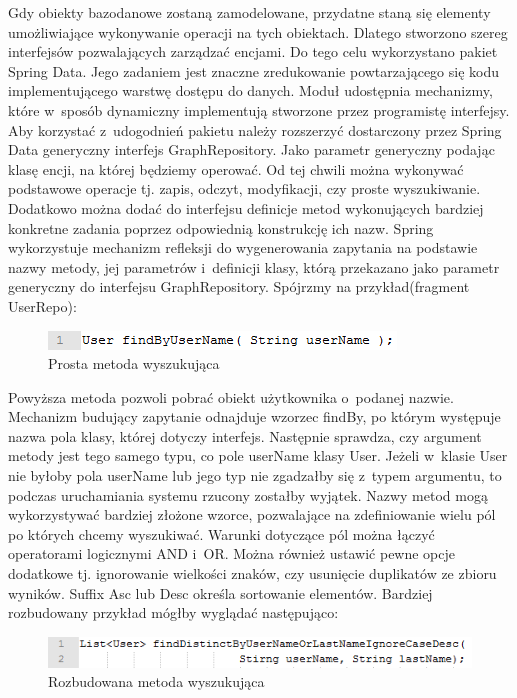 Gdy obiekty bazodanowe zostaną zamodelowane, przydatne staną się elementy umożliwiające wykonywanie operacji na tych obiektach. Dlatego stworzono szereg interfejsów pozwalających zarządzać encjami. Do tego celu wykorzystano pakiet Spring Data. Jego zadaniem jest znaczne zredukowanie powtarzającego się kodu implementującego warstwę dostępu do danych. Moduł udostępnia mechanizmy, które w~sposób dynamiczny implementują stworzone przez programistę interfejsy. Aby korzystać z~udogodnień pakietu należy rozszerzyć dostarczony przez Spring Data generyczny interfejs GraphRepository. Jako parametr generyczny podając klasę encji, na której będziemy operować. Od tej chwili można wykonywać podstawowe operacje tj. zapis, odczyt, modyfikacji, czy proste wyszukiwanie. Dodatkowo można dodać do interfejsu definicje metod wykonujących bardziej konkretne zadania poprzez odpowiednią konstrukcję ich nazw. Spring wykorzystuje mechanizm refleksji do wygenerowania zapytania na podstawie nazwy metody, jej parametrów i~definicji klasy, którą przekazano jako parametr generyczny do interfejsu GraphRepository. Spójrzmy na przykład(fragment UserRepo)\cite{repoWww}:

\begin{figure}[H]
	\centering
	\includegraphics{images/findbyusername.png}
	\caption{Prosta metoda wyszukująca}
\end{figure}


Powyższa metoda pozwoli pobrać obiekt użytkownika o~podanej nazwie. Mechanizm budujący zapytanie odnajduje wzorzec findBy, po którym występuje nazwa pola klasy, której dotyczy interfejs. Następnie sprawdza, czy argument metody jest tego samego typu, co pole userName klasy User. Jeżeli w~klasie User nie byłoby pola userName lub jego typ nie zgadzałby się z~typem argumentu, to podczas uruchamiania systemu rzucony zostałby wyjątek. 
Nazwy metod mogą wykorzystywać bardziej złożone wzorce, pozwalające na zdefiniowanie wielu pól po których chcemy wyszukiwać. Warunki dotyczące pól można łączyć operatorami logicznymi AND i~OR.  Można również ustawić pewne opcje dodatkowe tj. ignorowanie wielkości znaków, czy usunięcie duplikatów ze zbioru wyników. Suffix Asc lub Desc określa sortowanie elementów. Bardziej rozbudowany przykład mógłby wyglądać następująco:

\begin{figure}[H]
	\centering
	\includegraphics{images/findlong.png}
	\caption{Rozbudowana metoda wyszukująca}
\end{figure}


